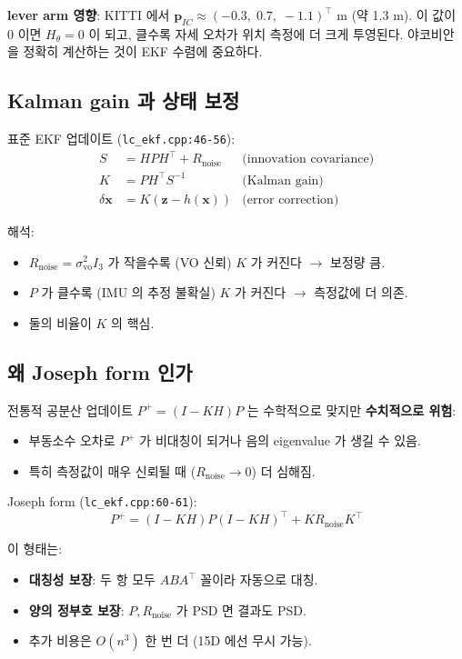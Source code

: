 \documentclass[11pt,a4paper,oneside]{report}
\newcommand{\T}{^{\!\top}}
\begin{document}
\textbf{lever arm 영향}: KITTI 에서 \(\bm{p}_{IC} \approx (-0.3,\; 0.7,\; -1.1)^{\!\top}\) m (약 1.3 m). 이 값이 0 이면 \(H_\theta = 0\) 이 되고, 클수록 자세 오차가 위치 측정에 더 크게 투영된다. 야코비안을 정확히 계산하는 것이 EKF 수렴에 중요하다.

\subsection{Kalman gain 과 상태 보정}

표준 EKF 업데이트 (\texttt{lc\_ekf.cpp:46-56}):
\begin{align}
S &= H P H\T + R_{\text{noise}} & \text{(innovation covariance)} \\
K &= P H\T S^{-1} & \text{(Kalman gain)} \\
\delta\bm{x} &= K (\bm{z} - h(\bm{x})) & \text{(error correction)}
\end{align}

해석:
\begin{itemize}
\item \(R_{\text{noise}} = \sigma_{\text{vo}}^2 I_3\) 가 작을수록 (VO 신뢰) \(K\) 가 커진다 \(\to\) 보정량 큼.
\item \(P\) 가 클수록 (IMU 의 추정 불확실) \(K\) 가 커진다 \(\to\) 측정값에 더 의존.
\item 둘의 비율이 \(K\) 의 핵심.
\end{itemize}

\subsection{왜 Joseph form 인가}

전통적 공분산 업데이트 \(P^+ = (I - KH) P\) 는 수학적으로 맞지만 \textbf{수치적으로 위험}:
\begin{itemize}
\item 부동소수 오차로 \(P^+\) 가 비대칭이 되거나 음의 eigenvalue 가 생길 수 있음.
\item 특히 측정값이 매우 신뢰될 때 (\(R_{\text{noise}} \to 0\)) 더 심해짐.
\end{itemize}

Joseph form (\texttt{lc\_ekf.cpp:60-61}):
\begin{equation}
\boxed{P^+ = (I - KH) P (I - KH)\T + K R_{\text{noise}} K\T}
\end{equation}

이 형태는:
\begin{itemize}
\item \textbf{대칭성 보장}: 두 항 모두 \(A B A\T\) 꼴이라 자동으로 대칭.
\item \textbf{양의 정부호 보장}: \(P, R_{\text{noise}}\) 가 PSD 면 결과도 PSD.
\item 추가 비용은 \(O(n^3)\) 한 번 더 (15D 에선 무시 가능).
\end{itemize}
\end{document}
